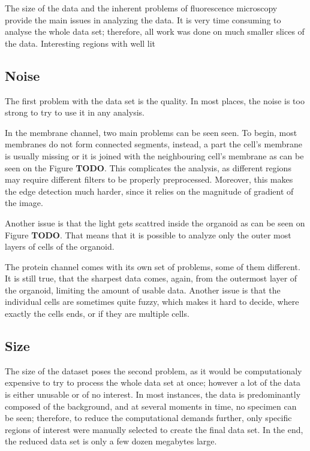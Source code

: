 \documentclass[
  digital,     %
  oneside,     %
  nosansbold,  %
  nocolorbold, %
  lof,         %
  lot,         %
]{fithesis4}
\begin{document}
The size of the data and the inherent problems of fluorescence microscopy
provide the main issues in analyzing the data. It is very time consuming to
analyse the whole data set; therefore, all work was done on much smaller slices
of the data. Interesting regions with well lit

\subsection{Noise}

The first problem with the data set is the quality. In most places, the noise is
too strong to try to use it in any analysis.

In the membrane channel, two main problems can be seen seen. To begin, most
membranes do not form connected segments, instead, a part the cell's membrane is
usually missing or it is joined with the neighbouring cell's membrane as can be
seen on the Figure \textbf{TODO}. This complicates the analysis, as different
regions may require different filters to be properly preprocessed. Moreover,
this makes the edge detection much harder, since it relies on the magnitude of
gradient of the image.

Another issue is that the light gets scattred inside the organoid as can be seen
on Figure \textbf{TODO}. That means that it is possible to analyze only the
outer most layers of cells of the organoid.

The protein channel comes with its own set of problems, some of them different.
It is still true, that the sharpest data comes, again, from the outermost layer
of the organoid, limiting the amount of usable data. Another issue is that the
individual cells are sometimes quite fuzzy, which makes it hard to decide, where
exactly the cells ends, or if they are multiple cells.

\subsection{Size}

The size of the dataset poses the second problem, as it would be computationaly
expensive to try to process the whole data set at once; however a lot of the
data is either unusable or of no interest. In most instances, the data is
predominantly composed of the background, and at several moments in time, no
specimen can be seen; therefore, to reduce the computational demands further,
only specific regions of interest were manually selected to create the final
data set. In the end, the reduced data set is only a few dozen megabytes large.
\end{document}
